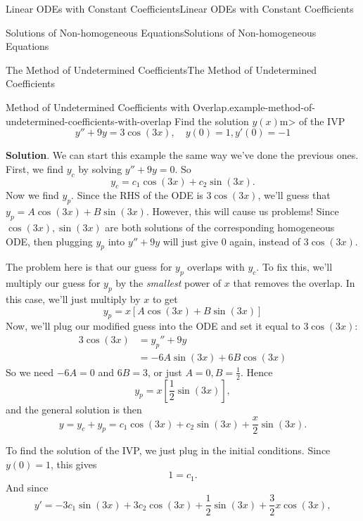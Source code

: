 \documentclass[10pt,]{book}
\numberwithin{equation}{section}
\newcommand{\amp}{&}
\begin{document}
\begin{chapterptx}{Linear ODEs with Constant Coefficients}{}{Linear ODEs with Constant Coefficients}{}{}
\begin{sectionptx}{Solutions of Non-homogeneous Equations}{}{Solutions of Non-homogeneous Equations}{}{}
\begin{subsectionptx}{The Method of Undetermined Coefficients}{}{The Method of Undetermined Coefficients}{}{}
\begin{example}{Method of Undetermined Coefficients with Overlap.}{example-method-of-undetermined-coefficients-with-overlap}
\hypertarget{p-238}{}%
Find the solution \(y(x)\)m> of the IVP%
\begin{equation*}
y''+9y = 3\cos(3x),\quad y(0) = 1,y'(0) = -1
\end{equation*}
%
\par\smallskip%
\noindent\textbf{Solution}.\hypertarget{solution-34}{}\quad%
\hypertarget{p-239}{}%
We can start this example the same way we've done the previous ones. First, we find \(y_{c}\) by solving \(y''+9y=0\). So%
\begin{equation*}
y_{c} = c_{1}\cos(3x)+c_{2}\sin(3x).
\end{equation*}
Now we find \(y_{p}\). Since the RHS of the ODE is \(3\cos(3x)\), we'll guess that \(y_{p} = A\cos(3x)+B\sin(3x)\). However, this will cause us problems! Since \(\cos(3x),\sin(3x)\) are both solutions of the corresponding homogeneous ODE, then plugging \(y_{p}\) into \(y''+9y\) will just give \(0\) again, instead of \(3\cos(3x)\).%
\par
\hypertarget{p-240}{}%
The problem here is that our guess for \(y_{p}\) overlaps with \(y_{c}\). To fix this, we'll multiply our guess for \(y_{p}\) by the \emph{smallest} power of \(x\) that removes the overlap. In this case, we'll just multiply by \(x\) to get%
\begin{equation*}
y_{p} = x[A\cos(3x)+B\sin(3x)]
\end{equation*}
Now, we'll plug our modified guess into the ODE and set it equal to \(3\cos(3x)\):%
\begin{align*}
3\cos(3x)\amp = y_{p}'' + 9y\\
\amp = -6A\sin(3x)+6B\cos(3x)
\end{align*}
So we need \(-6A = 0\) and \(6B = 3\), or just \(A = 0,B = \frac{1}{2}\). Hence%
\begin{equation*}
y_{p} = x\left[\frac{1}{2}\sin(3x)\right],
\end{equation*}
and the general solution is then%
\begin{equation*}
y = y_{c}+y_{p} = c_{1}\cos(3x)+c_{2}\sin(3x) + \frac{x}{2}\sin(3x).
\end{equation*}
%
\par
\hypertarget{p-241}{}%
To find the solution of the IVP, we just plug in the initial conditions. Since \(y(0) = 1\), this gives%
\begin{equation*}
1 = c_{1}.
\end{equation*}
And since%
\begin{equation*}
y' = -3c_{1}\sin(3x)+3c_{2}\cos(3x) + \frac{1}{2}\sin(3x)+\frac{3}{2}x\cos(3x),

\end{equation*}
\end{example}
\end{subsectionptx}
\end{sectionptx}
\end{chapterptx}
\end{document}
